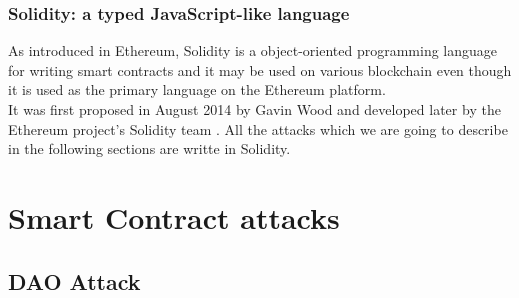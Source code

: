 \subsubsection{Solidity: a typed JavaScript-like language}
As introduced in Ethereum, Solidity is a object-oriented programming language for writing smart contracts and it may be used on various blockchain even though it is used as the primary language on the Ethereum platform.
\\It was first proposed in August 2014 by Gavin Wood and developed later by the Ethereum project's Solidity team \cite{solidity}. 
All the attacks which we are going to describe in the following sections are writte in Solidity. 

\section{Smart Contract attacks}
\subsection{DAO Attack}
